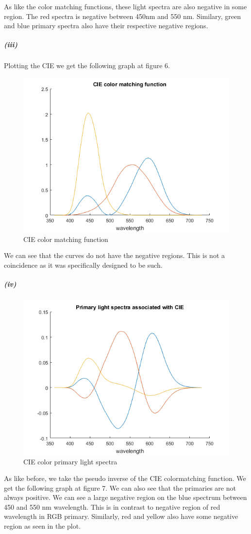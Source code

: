 \documentclass[12pt,letterpaper]{article}
\begin{document}
As like the color matching functions, these light spectra are also negative in some region. The red spectra is negative between 450nm and 550 nm. Similary, green and blue primary spectra also have their respective negative regions. 
\subparagraph*{(iii)}

Plotting the CIE we get the following graph at figure 6.
\begin{figure}[htbp]
	\includegraphics{cie.png}
	\caption{CIE color matching function}
\end{figure}

We can see that the curves do not have the negative regions. This is not a coincidence as it was specifically designed to be such.

\subparagraph*{(iv)}
\begin{figure}[htbp]
	\includegraphics{cieinv.png}
	\caption{CIE color primary light spectra}
\end{figure}
As like before, we take the pseudo inverse of the CIE colormatching function. We get the following graph at figure 7. We can also see that the primaries are not always positive. We can see a large negative region on the blue spectrum between 450 and 550 nm wavelength. This is in contrast to negative region of red wavelength in RGB primary.
Similarly, red and yellow also have some negative region as seen in the plot.
\end{document}
